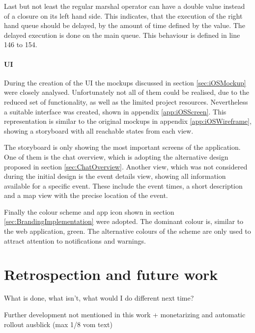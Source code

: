 Last but not least the regular marshal operator can have a double value instead of a closure on its left hand side. This indicates, that the execution of the right hand queue should be delayed, by the amount of time defined by the value. The delayed execution is done on the main queue. This behaviour is defined in line 146 to 154.

\subsubsection{UI}

During the creation of the \gls{UI} the mockups discussed in section \vref{sec:iOSMockup} were closely analysed. Unfortunately not all of them could be realised, due to the reduced set of functionality, as well as the limited project resources. Nevertheless a suitable interface was created, shown in appendix \vref{app:iOSScreen}. This representation is similar to the original mockups in appendix \vref{app:iOSWireframe}, showing a storyboard with all reachable states from each view. 

The storyboard is only showing the most important screens of the application. One of them is the chat overview, which is adopting the alternative design proposed in section \vref{sec:ChatOverview}. Another view, which was not considered during the initial design is the event details view, showing all information available for a specific event. These include the event times, a short description and a map view with the precise location of the event.

Finally the colour scheme and app icon shown in section \vref{sec:BrandingImplementation} were adopted. The dominant colour is, similar to the web application, green. The alternative colours of the scheme are only used to attract attention to notifications and warnings. 

\chapter{Retrospection and future work}
\label{chapter:OngoingWork}

What is done, what isn't, what would I do different next time?

Further development not mentioned in this work + monetarizing and automatic rollout
ausblick (max 1/8 vom text)

